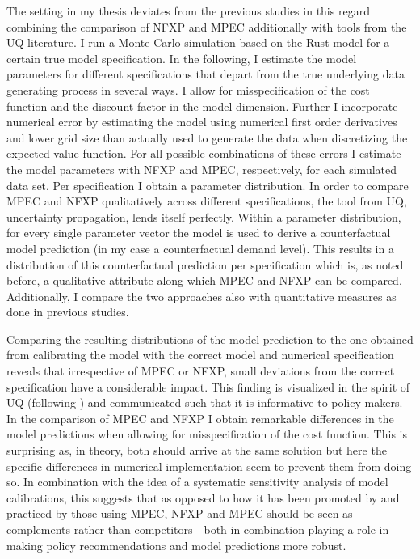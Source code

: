 The setting in my thesis deviates from the previous studies in this regard combining the comparison of NFXP and MPEC additionally with tools from the UQ literature. I run a Monte Carlo simulation based on the Rust model for a certain true model specification. In the following, I estimate the model parameters for different specifications that depart from the true underlying data generating process in several ways. I allow for misspecification of the cost function and the discount factor in the model dimension. Further I incorporate numerical error by estimating the model using numerical first order derivatives and lower grid size than actually used to generate the data when discretizing the expected value function. For all possible combinations of these errors I estimate the model parameters with NFXP and MPEC, respectively, for each simulated data set. Per specification I obtain a parameter distribution. In order to compare MPEC and NFXP qualitatively across different specifications, the tool from UQ, uncertainty propagation, lends itself perfectly. Within a parameter distribution, for every single parameter vector the model is used to derive a counterfactual model prediction (in my case a counterfactual demand level). This results in a distribution of this counterfactual prediction per specification which is, as noted before, a qualitative attribute along which MPEC and NFXP can be compared. Additionally, I compare the two approaches also with quantitative measures as done in previous studies.

Comparing the resulting distributions of the model prediction to the one obtained from calibrating the model with the correct model and numerical specification reveals that irrespective of MPEC or NFXP, small deviations from the correct specification have a considerable impact. This finding is visualized in the spirit of UQ (following \cite{Oberkampf.2010}) and communicated such that it is informative to policy-makers. In the comparison of MPEC and NFXP I obtain remarkable differences in the model predictions when allowing for misspecification of the cost function. This is surprising as, in theory, both should arrive at the same solution but here the specific differences in numerical implementation seem to prevent them from doing so. In combination with the idea of a systematic sensitivity analysis of model calibrations, this suggests that as opposed to how it has been promoted by \cite{Su.Judd.2012} and practiced by those using MPEC, NFXP and MPEC should be seen as complements rather than competitors - both in combination playing a role in making policy recommendations and model predictions more robust.

